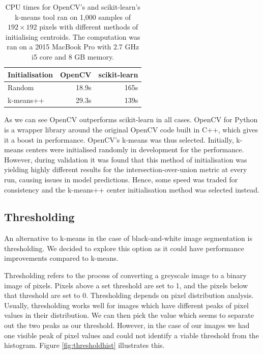 \begin{table}[h]
\centering
\caption{CPU times for OpenCV's and scikit-learn's k-means tool ran on 1,000 samples of $192\times192$ pixels with different methods of initialising centroids.  The computation was ran on a 2015 MacBook Pro with 2.7 GHz i5 core and 8 GB memory.}
\begin{tabular}{l|r|r}
\rowcolor[HTML]{EFEFEF} 
\textbf{Initialisation} & \textbf{OpenCV} & \textbf{scikit-learn} \\ \hline
Random                                   & 18.9s       & 165s \\ \hline
k-means++  & 29.3s   & 139s   \\ 
\end{tabular}
\end{table}

As we can see OpenCV outperforms scikit-learn in all cases. OpenCV for Python is a wrapper library around the original OpenCV code built in C++, which gives it a boost in performance. OpenCV's k-means was thus selected. Initially, k-means centers were initialised randomly in development for the performance. However, during validation it was found that this method of initialisation was yielding highly different results for the intersection-over-union metric at every run, causing issues in model predictions. Hence, some speed was traded for consistency and the k-means++ center initialisation method was selected instead. 

\subsection{Thresholding}

An alternative to k-means in the case of black-and-white image segmentation is thresholding. We decided to explore this option as it could have performance improvements compared to k-means. 

Thresholding refers to the process of converting a greyscale image to a binary image of pixels. Pixels above a set threshold are set to 1, and the pixels below that threshold are set to 0. Thresholding depends on pixel distribution analysis. Usually, thresholding works well for images which have different peaks of pixel values in their distribution. We can then pick the value which seems to separate out the two peaks as our threshold. However, in the case of our images we had one visible peak of pixel values and could not identify a viable threshold from the histogram. Figure \ref{fig:thresholdhist} illustrates this.

